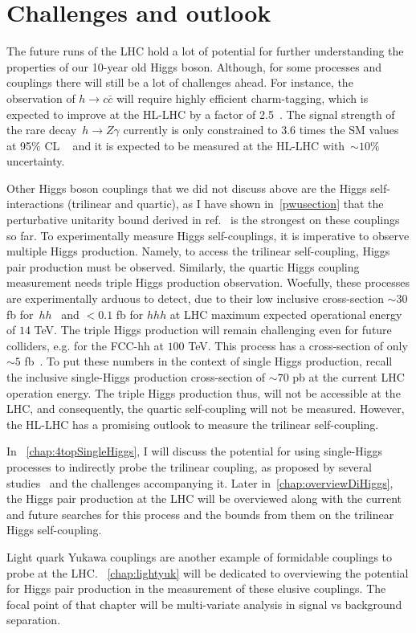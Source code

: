 \section{Challenges and outlook \label{sec:Higgscouplchallenge} }
\par The future runs of the LHC  hold a lot of potential for further understanding  the properties of our 10-year old Higgs boson.  Although, for some processes and couplings there will still be a lot of challenges ahead. For instance, the observation of $h \to c \bar{c}$ will require highly efficient charm-tagging, which is expected to improve at the HL-LHC by a factor of 2.5~\cite{ATL-PHYS-PUB-2018-016}.  The signal strength of the rare decay~$ h \to Z \gamma$ currently is  only constrained to $3.6$ times the SM values at 95\% CL ~\cite{ATLAS:2020qcv} and it is expected to be measured at the HL-LHC with~$\sim 10\%$ uncertainty. 
\par Other Higgs boson couplings that we did not discuss above are the Higgs self-interactions (trilinear and quartic), as I have shown in~\autoref{pwusection} that the perturbative unitarity bound derived in ref.~\cite{DiLuzio:2017tfn} is the strongest on these couplings so far.  To experimentally measure Higgs self-couplings, it is imperative to observe multiple Higgs production. Namely, to access the trilinear self-coupling, Higgs pair production must be observed. Similarly, the quartic Higgs coupling measurement needs triple Higgs production observation. Woefully, these processes are experimentally arduous to detect, due to their low inclusive cross-section $\sim 30$ fb for~$hh$~\cite{Dawson:1998py} and $<0.1$ fb for $hhh$ at LHC maximum expected operational energy of $14$ TeV. The triple Higgs production will remain challenging even for future colliders, e.g. for the FCC-hh at $100$ TeV. This process has a cross-section of only $\sim 5$ fb~\cite{Papaefstathiou:2015paa}.  To put these numbers in the context of single Higgs production, recall the inclusive single-Higgs production cross-section of $\sim 70$ pb at the current LHC operation energy.  The triple Higgs production thus, will not be accessible at the LHC, and consequently, the quartic self-coupling will not be measured. However, the HL-LHC has a promising outlook to measure the trilinear self-coupling.
\par In ~\autoref{chap:4topSingleHiggs}, I will discuss the potential for using single-Higgs processes to indirectly probe the trilinear coupling, as proposed by several studies~\cite{McCullough:2013rea, Gorbahn:2016uoy, Degrassi:2016wml, Bizon:2016wgr, Maltoni:2017ims, Degrassi:2019yix, Degrassi:2021uik, Haisch:2021hvy} and the challenges accompanying it. Later in~\autoref{chap:overviewDiHiggs}, the Higgs pair production at the LHC will be overviewed along with the current and future searches for this process and the bounds from them on the trilinear Higgs self-coupling. 
\par Light quark Yukawa couplings are another example of formidable couplings to probe at the LHC. ~\autoref{chap:lightyuk} will be dedicated to overviewing the potential for Higgs pair production in the measurement of these elusive couplings. The focal point of that chapter will be multi-variate analysis in signal vs background separation.
